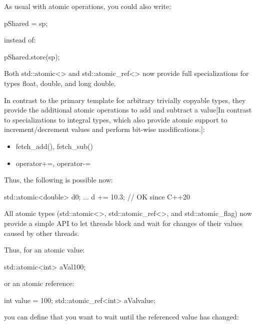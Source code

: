 As usual with atomic operations, you could also write:

\begin{cpp}
pShared = sp;
\end{cpp}

instead of:

\begin{cpp}
pShared.store(sp);
\end{cpp}


Both std::atomic<> and std::atomic\_ref<> now provide full specializations for types float, double, and long double.

In contrast to the primary template for arbitrary trivially copyable types, they provide the additional atomic operations to add and subtract a value[In contrast to specializations to integral types, which also provide atomic support to increment/decrement values and perform bit-wise modifications.]:

\begin{itemize}
\item 
fetch\_add(), fetch\_sub()

\item 
operator+=, operator-=
\end{itemize}

Thus, the following is possible now:

\begin{cpp}
std::atomic<double> d{0};
...
d += 10.3; // OK since C++20
\end{cpp}


All atomic types (std::atomic<>, std::atomic\_ref<>, and std::atomic\_flag) now provide a simple API to let threads block and wait for changes of their values caused by other threads.

Thus, for an atomic value:

\begin{cpp}
std::atomic<int> aVal{100};
\end{cpp}

or an atomic reference:

\begin{cpp}
int value = 100;
std::atomic_ref<int> aVal{value};
\end{cpp}

you can define that you want to wait until the referenced value has changed:

